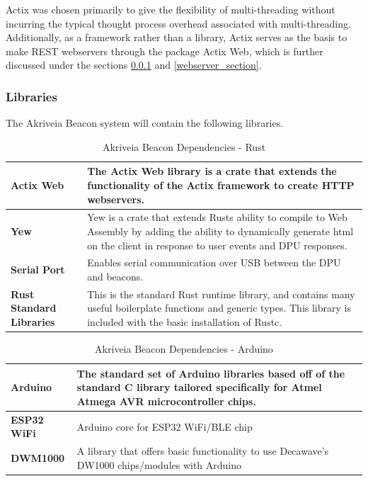 \bigskip
Actix was chosen primarily to give the flexibility of multi-threading without incurring the typical thought process overhead associated with multi-threading.
Additionally, as a framework rather than a library, Actix serves as the basis to make REST webservers through the package \Gls{Actix Web}, which is further discussed under the sections \ref{software_libraries} and \ref{webserver_section}.

\pagebreak
\subsubsection{Libraries}
\label{software_libraries}
\medskip
The Akriveia Beacon system will contain the following libraries.
\medskip
\begin{table}[H]
\centering
\begin{tabular}{ | m{3.25cm} | m{12.5cm} |}
	\hline
	\textbf{Actix Web} & The Actix Web library is a crate that extends the functionality of the Actix framework to create \Gls{HTTP} webservers. \\
	\hline
	\textbf{Yew} & Yew is a crate that extends Rusts ability to compile to Web Assembly by adding the ability to dynamically generate html on the client in response to user events and DPU responses. \\
	\hline
	\textbf{Serial Port} & Enables serial communication over USB between the DPU and beacons.\\
	\hline
	\textbf{Rust Standard Libraries} & This is the standard Rust runtime library, and contains many useful boilerplate functions and generic types. This library is included with the basic installation of Rustc. \\
	\hline
\end{tabular}
\caption{Akriveia Beacon Dependencies - Rust}
\end{table}

\begin{table}[H]
\centering
\begin{tabular}{ | m{3.25cm} | m{12.5cm} |}
	\hline
	\textbf{Arduino} & The standard set of Arduino libraries based off of the standard C library tailored specifically for Atmel Atmega AVR  microcontroller chips. \\
	\hline
	\textbf{ESP32 WiFi} &  Arduino core for ESP32 WiFi/BLE chip\\
	\hline
	\textbf{DWM1000} & A library that offers basic functionality to use Decawave's DW1000 chips/modules with Arduino \\
	\hline
\end{tabular}
\caption{Akriveia Beacon Dependencies - Arduino}
\end{table}

